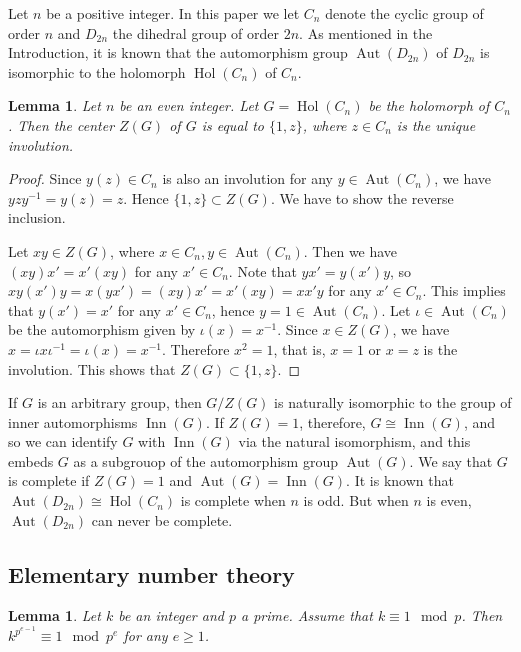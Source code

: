 \documentclass{amsart}
\newtheorem{lem}[thm]{Lemma}
\begin{document}
Let $n$ be a positive integer.
In this paper we let $C_n$ denote the cyclic group of order $n$ and $D_{2n}$ the dihedral group of order $2n$.
As mentioned in the Introduction, it is known that the automorphism group $\operatorname{Aut}(D_{2n})$ of $D_{2n}$ is isomorphic to the holomorph $\operatorname{Hol}(C_n)$ of $C_n$.


\begin{lem}\label{center}
Let $n$ be an even integer.
Let $G=\operatorname{Hol}(C_n)$ be the holomorph of $C_n$.
Then the center $Z(G)$ of $G$ is equal to $\{1, z\}$, where $z \in C_n$ is the unique involution.
\end{lem}
   
\begin{proof}   
Since $y(z) \in C_n$ is also an involution for any $y \in \operatorname{Aut}(C_n)$, we have $yzy^{-1}=y(z)=z$.
Hence $\{ 1, z \} \subset Z(G)$.
We have to show the reverse inclusion.
   
Let $xy \in Z(G)$, where $x \in C_n, y \in \operatorname{Aut}(C_n)$.
Then we have $(xy)x'=x'(xy)$ for any $x' \in C_n$.
Note that $yx'=y(x')y$, so $xy(x')y=x(yx')=(xy)x'=x'(xy)=xx'y$ for any $x' \in C_n$.
This implies that $y(x')=x'$ for any $x' \in C_n$, hence $y=1 \in \operatorname{Aut}(C_n)$.
Let $\iota \in \operatorname{Aut}(C_n)$ be the automorphism given by $\iota(x)=x^{-1}$.
Since $x \in Z(G)$, we have $x=\iota x \iota^{-1} =\iota(x)=x^{-1}$.
Therefore $x^2=1$, that is, $x=1$ or $x=z$ is the involution.
This shows that $Z(G) \subset \{1, z\}$.
\end{proof}

If $G$ is an arbitrary group, then $G/Z(G)$ is naturally isomorphic to the group of inner automorphisms $\operatorname{Inn}(G)$.
If $Z(G)=1$, therefore, $G \cong \operatorname{Inn}(G)$, and so we can identify $G$ with $\operatorname{Inn}(G)$ via the natural isomorphism, and this embeds $G$ as a subgrouop of the automorphism group $\operatorname{Aut}(G)$.
We say that $G$ is complete if $Z(G)=1$ and $\operatorname{Aut}(G)=\operatorname{Inn}(G)$.
It is known that $\operatorname{Aut}(D_{2n})\cong \operatorname{Hol}(C_n)$ is complete when $n$ is odd.
But when $n$ is even, $\operatorname{Aut}(D_{2n})$ can never be complete.

\subsection{Elementary number theory}
\begin{lem}\label{powermodp}
Let $k$ be an integer and $p$ a prime.
Assume that $k \equiv 1 \mod p$.
Then $k^{p^{e-1}} \equiv 1 \mod p^e$ for any $e \geq 1$.
\end{lem}
\end{document}
